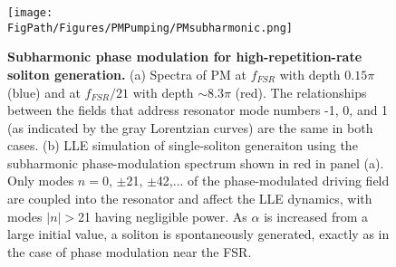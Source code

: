 
\begin{figure}[htpb]
	\begin{center}
		\texttt{[image: \\FigPath/Figures/PMPumping/PMsubharmonic.png]}
	\end{center}
	\caption[Subharmonic phase modulation for high repetition-rate soliton generation]{\textbf{Subharmonic phase modulation for high-repetition-rate soliton generation.} (a) Spectra of PM at $f_{FSR}$ with depth $0.15\pi$ (blue) and at $f_{FSR}/21$ with depth $\sim$8.3$\pi$ (red). The relationships between the fields that address resonator mode numbers -1, 0, and 1 (as indicated by the gray Lorentzian curves) are the same in both cases. (b) LLE simulation of single-soliton generaiton using the subharmonic phase-modulation spectrum shown in red in panel (a). Only modes $n=0$, $\pm$21, $\pm$42,... of the phase-modulated driving field are coupled into the resonator and affect the LLE dynamics, with modes $|n|>$21 having negligible power. As $\alpha$ is increased from a large initial value, a soliton is spontaneously generated, exactly as in the case of phase modulation near the FSR.}
	\label{fig:PMsubharmonic}
\end{figure} 

